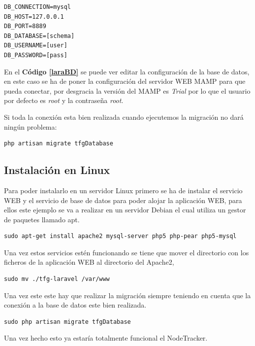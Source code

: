 \begin{lstlisting}[caption=Configuracion de la BD en Laravel, label=laraBD]
DB_CONNECTION=mysql
DB_HOST=127.0.0.1
DB_PORT=8889
DB_DATABASE=[schema]
DB_USERNAME=[user]
DB_PASSWORD=[pass]
\end{lstlisting}

En el \textbf{Código \ref{laraBD}} se puede ver editar la configuración de la base de datos, en este caso se ha de poner la configuración del servidor WEB MAMP para que pueda conectar, por desgracia la versión del MAMP es \textit{Trial} por lo que el usuario por defecto es \textit{root} y la contraseña \textit{root}.

Si toda la conexión esta bien realizada cuando ejecutemos la migración no dará ningún problema:

\begin{lstlisting}[caption=Migracion, label=phpmigrate]
	php artisan migrate tfgDatabase
\end{lstlisting}

\subsection{Instalación en Linux}

Para poder instalarlo en un servidor Linux primero se ha de instalar el servicio WEB y el servicio de base de datos para poder alojar la aplicación WEB, para ellos este ejemplo se va a realizar en un servidor Debian el cual utiliza un gestor de paquetes llamado apt.

\begin{lstlisting}[caption=Instalación del Servicio Apache en Linux, label=apachelinux]
sudo apt-get install apache2 mysql-server php5 php-pear php5-mysql
\end{lstlisting}

Una vez estos servicios estén funcionando se tiene que mover el directorio con los ficheros de la aplicación WEB al directorio del Apache2,

\begin{lstlisting}[caption=Instalación del Servicio Apache en Linux, label=apachelinux]
sudo mv ./tfg-laravel /var/www
\end{lstlisting}

Una vez este este hay que realizar la migración siempre teniendo en cuenta que la conexión a la base de datos este bien realizada.

\begin{lstlisting}[caption=Migracion en Debian, label=debphpmigrate]
sudo php artisan migrate tfgDatabase
\end{lstlisting}

Una vez hecho esto ya estaría totalmente funcional el NodeTracker.
